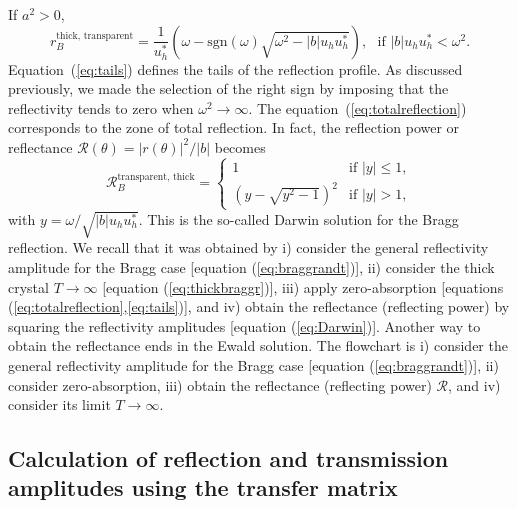 \documentclass[preprint]{iucr}              %
\newcommand{\inblue}[1]{{\color{blue}#1}}
\begin{document}
If $a^2 > 0$,
\begin{equation}\label{eq:tails}
    r_B^{\text{thick, transparent}} =
    \frac{1}{u_{h}^*}\left( \omega-\text{sgn}(\omega)\sqrt{\omega^2-|b|u_h u_h^*} \right), ~~~ \text{if~}|b|u_h u_h^* < \omega^2.
\end{equation}
Equation~(\ref{eq:tails}) defines the tails of the reflection profile. As discussed previously, we made the selection of the right sign by imposing that the reflectivity tends to zero when $\omega^2 \rightarrow \infty$. The equation~(\ref{eq:totalreflection}) corresponds to the zone of total reflection. In fact, the reflection power or reflectance $\mathcal{R} (\theta)=|r(\theta)|^2 / |b|$ becomes
\begin{equation}\label{eq:Darwin}
\mathcal{R}_B^{\text{transparent, thick}} =
    \begin{cases} 
    1
    & \text{if  $|y| \le 1$},\\
    ( y - \sqrt{y^2-1} )^2
    & \text{if $|y|>1$},
    \end{cases}
\end{equation}
with $y=\omega/\sqrt{|b|u_h u_h^*}$. This is the so-called Darwin solution for the Bragg reflection. We recall that it was obtained by
i) consider the general reflectivity amplitude for the Bragg case [equation (\ref{eq:braggrandt})],
ii) consider the thick crystal $T\rightarrow \infty$ [equation (\ref{eq:thickbraggr})],
iii) apply zero-absorption [equations (\ref{eq:totalreflection},\ref{eq:tails})], and
iv) obtain the reflectance (reflecting power) by squaring the reflectivity amplitudes [equation (\ref{eq:Darwin})].
Another way to obtain the reflectance ends in the Ewald solution. The flowchart is \inblue{
i) consider the general reflectivity amplitude for the Bragg case [equation (\ref{eq:braggrandt})], ii) consider zero-absorption, 
iii) obtain the reflectance (reflecting power) $\mathcal{R}$, and
iv) consider its limit $T\rightarrow \infty$.}


\subsection{Calculation of reflection and transmission amplitudes using the transfer matrix}
\end{document}
